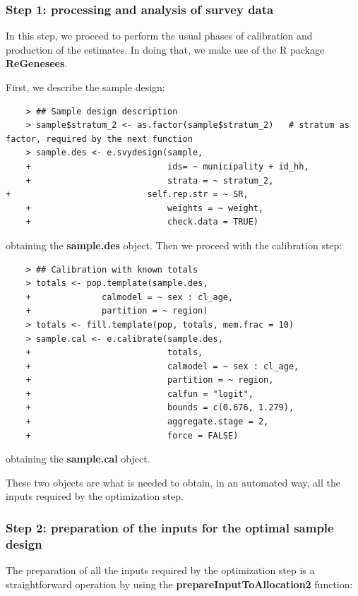 \subsubsection{Step 1: processing and analysis of survey data}
In this step, we proceed to perform the usual phases of calibration and production of the estimates. In doing that, we make use of the R package \textbf{ReGenesees}.

First, we describe the sample design:

\begin{verbatim}
	> ## Sample design description
	> sample$stratum_2 <- as.factor(sample$stratum_2)   # stratum as factor, required by the next function
	> sample.des <- e.svydesign(sample, 
	+                           ids= ~ municipality + id_hh, 
	+                           strata = ~ stratum_2, 
+                           self.rep.str = ~ SR, 
	+                           weights = ~ weight,
	+                           check.data = TRUE)
\end{verbatim}
obtaining the \textbf{sample.des} object. Then we proceed with the calibration step:
\begin{verbatim}
	> ## Calibration with known totals
	> totals <- pop.template(sample.des,
	+              calmodel = ~ sex : cl_age, 
	+              partition = ~ region)
	> totals <- fill.template(pop, totals, mem.frac = 10)
	> sample.cal <- e.calibrate(sample.des, 
	+                           totals,
	+                           calmodel = ~ sex : cl_age, 
	+                           partition = ~ region,
	+                           calfun = "logit",
	+                           bounds = c(0.676, 1.279), 
	+                           aggregate.stage = 2,
	+                           force = FALSE)
\end{verbatim}
obtaining the \textbf{sample.cal} object.

These two objects are what is needed to obtain, in an automated way, all the inputs required by the optimization step.

\subsubsection{Step 2: preparation of the inputs for the optimal sample design}

The preparation of all the inputs required by the optimization step is a straightforward operation by using the \textbf{prepareInputToAllocation2} function:

